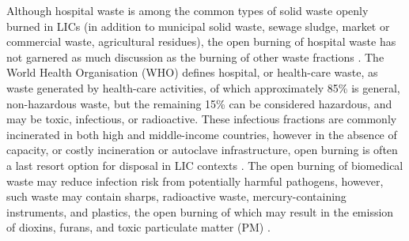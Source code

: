 \documentclass[
  authoryear,
  review,
  3p]{elsarticle}
\begin{document}
Although hospital waste is among the common types of solid waste openly
burned in LICs (in addition to municipal solid waste, sewage sludge,
market or commercial waste, agricultural residues), the open burning of
hospital waste has not garnered as much discussion as the burning of
other waste fractions \citep{cook2021globala}. The World Health
Organisation (WHO) defines hospital, or health-care waste, as waste
generated by health-care activities, of which approximately 85\% is
general, non-hazardous waste, but the remaining 15\% can be considered
hazardous, and may be toxic, infectious, or radioactive. These
infectious fractions are commonly incinerated in both high and
middle-income countries, however in the absence of capacity, or costly
incineration or autoclave infrastructure, open burning is often a last
resort option for disposal in LIC contexts \citep{who2018healthcare}.
The open burning of biomedical waste may reduce infection risk from
potentially harmful pathogens, however, such waste may contain sharps,
radioactive waste, mercury-containing instruments, and plastics, the
open burning of which may result in the emission of dioxins, furans, and
toxic particulate matter (PM)
\citep{who2018healthcare, cook2021globala}.
\end{document}
